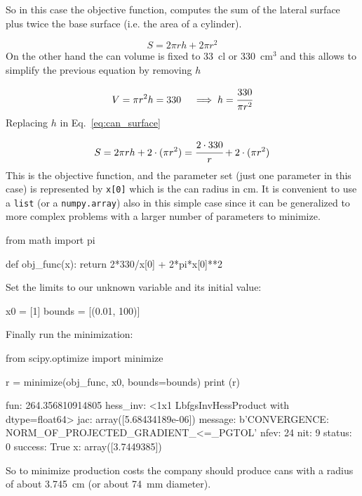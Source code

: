 So in this case the objective function, computes the sum of the lateral surface plus twice the base surface (i.e. the area of a cylinder).

\begin{equation} 
S = 2\pi rh + 2\pi r^2 
\label{eq:can_surface}
\end{equation}
On the other hand the can volume is fixed to 33~cl or 330~\(\mathrm{cm}^3\) and this allows to simplify the previous equation by removing \(h\)

\begin{equation*} 
V = \pi r^2 h = 330\quad\implies h = \cfrac{330}{\pi r^2}
\end{equation*}
Replacing $h$ in Eq.~\ref{eq:can_surface} 

\begin{equation}
S = 2\pi rh + 2\cdot(\pi r^2) = \cfrac{2\cdot 330}{r} + 2\cdot(\pi r^2)
\end{equation}
This is the objective function, and the parameter set (just one parameter in this case) is represented by \texttt{x[0]} which is the can radius in cm. It is convenient to use a \texttt{list} (or a \texttt{numpy.array}) also in this simple case since it can be generalized to more complex problems with a larger number of parameters to minimize. 

\begin{ipython}
from math import pi

def obj_func(x):
    return 2*330/x[0] + 2*pi*x[0]**2
\end{ipython}
\noindent
Set the limits to our unknown variable and its initial value:

\begin{ipython}
x0 = [1]
bounds = [(0.01, 100)]
\end{ipython}
\noindent
Finally run the minimization:

\begin{ipython}
from scipy.optimize import minimize

r = minimize(obj_func, x0, bounds=bounds)
print (r)
\end{ipython}
\begin{ioutput}
      fun: 264.356810914805
 hess_inv: <1x1 LbfgsInvHessProduct with dtype=float64>
      jac: array([5.68434189e-06])
  message: b'CONVERGENCE: NORM_OF_PROJECTED_GRADIENT_<=_PGTOL'
     nfev: 24
      nit: 9
   status: 0
  success: True
        x: array([3.7449385])
\end{ioutput}
So to minimize production costs the company should produce cans with a radius of about 3.745~cm (or about 74~mm diameter).

